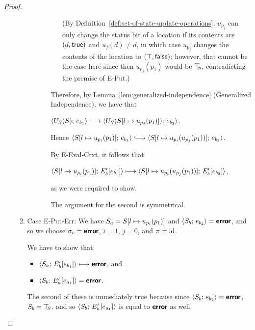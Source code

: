 \begin{proof}
\begin{enumerate}
\begin{enumerate}
\begin{itemize}
\begin{itemize}
\begin{itemize}
            (By Definition~\ref{def:set-of-state-update-operations},
            $u_{p_j}$ can only change the status bit of a location if
            its contents are $(d, \textsf{true})$ and $u_j(d) \neq
            d$, in which case $u_{p_j}$ changes the contents of the
            location to $(\top, \textsf{false})$; however, that
            cannot be the case here since then $u_{p_j}(p_1)$ would be
            $\top\hspace{-0.85mm}_{p}$, contradicting the premise of {\sc E-Put}.)
          \end{itemize}

          Therefore, by Lemma~\ref{lem:generalized-independence}
          (Generalized Independence), we have that

          $\config{U_S(S)}{e_{b_1}} \parstepsto
          \config{U_S(\extSRaw{S}{l}{u_{p_j}(p_1)})}{e_{b_2}}$.

          Hence $\config{\extSRaw{S}{l}{u_{p_i}(p_1)}}{e_{b_1}}
          \parstepsto
          \config{\extSRaw{S}{l}{u_{p_i}(u_{p_j}(p_1))}}{e_{b_2}}$.

          By {\sc E-Eval-Ctxt}, it follows that

          $\langle S[l \mapsto u_{p_i}(p_1)];\, E'_b\hspace{-0.5mm}\left[e_{b_1}\right] \rangle
          \longmapsto
          \langle S[l \mapsto u_{p_i}(u_{p_j}(p_1))];\, E'_b\hspace{-0.5mm}\left[e_{b_2}\right] \rangle$,

          as we were required to show.

          The argument for the second is symmetrical.

        \end{itemize}

      \end{itemize}

    \item \label{slqc-put-put-err}Case {\sc E-Put-Err}: We have $S_a =
      S[l \mapsto u_{p_i}(p_1)]$ and $\langle S_b;\, e_{b_2} \rangle =
      \textbf{\textsf{error}}$, and so we choose $\sigma_c = \textbf{\textsf{error}}$, $i = 1$, $j = 0$,
      and $\pi = \mathrm{id}$.

      We have to show that:
      \begin{itemize}
      \item $\langle S_a;\, E'_b\hspace{-0.5mm}\left[e_{b_1}\right] \rangle \longmapsto
        \textbf{\textsf{error}}$, and
      \item $\langle S_b;\, E'_a\hspace{-0.5mm}\left[e_{a_1}\right] \rangle = \textbf{\textsf{error}}$.
      \end{itemize}

      The second of these is immediately true because since
      $\langle S_b;\, e_{b_2} \rangle = \textbf{\textsf{error}}$, $S_b = \top\hspace{-0.85mm}_{S}$, and so
      $\langle S_b;\, E'_a\hspace{-0.5mm}\left[e_{a_1}\right] \rangle$ is equal to $\textbf{\textsf{error}}$ as
      well.


\end{enumerate}
\end{enumerate}
\end{proof}
